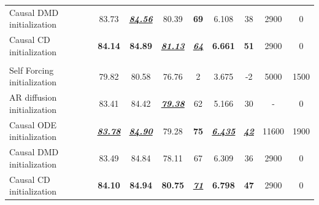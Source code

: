 \begin{table}
\begin{tabular}{lcccccccc}
      Causal DMD initialization  & 83.73 & \underline{\textbf{\textit{84.56}}}  &   80.39& \textbf{69} & 6.108 & 38 & \cellcolor{green!10}2900&\cellcolor{green!10}0 \\
      Causal CD initialization  &\textbf{84.14} & \textbf{84.89}  &   \underline{\textbf{\textit{81.13}}} & \underline{\textbf{\textit{64}}} &\textbf{6.661} & \textbf{51} & \cellcolor{green!10}2900& \cellcolor{green!10}0 \\
        \midrule
     \rowcolor{catgray}
    \multicolumn{9}{l}{\textit{4-Step Asymmetric DMD}}\\
     Self Forcing initialization  & 79.82 & 80.58  &  76.76& 2 & 3.675 & -2 &\cellcolor{red!10}5000 &\cellcolor{red!10}1500\\
      AR diffusion initialization  & 83.41 & 84.42  &   \underline{\textbf{\textit{79.38}}} & 62 & 5.166 &  30& \cellcolor{green!10}- &\cellcolor{green!10}0\\
      Causal ODE initialization  & \underline{\textbf{\textit{83.78}}} & \underline{\textbf{\textit{84.90}}}  &   79.28  &  \textbf{75}&\underline{\textbf{\textit{6.435}}} &  \underline{\textbf{\textit{42}}}& \cellcolor{red!10}11600 & \cellcolor{red!10}1900 \\
      Causal DMD initialization  &83.49 & 84.84  &   78.11& 67 & 6.309&  36 & \cellcolor{green!10}2900 & \cellcolor{green!10}0\\
      Causal CD initialization  & \textbf{84.10} & \textbf{84.94}  &   \textbf{80.75} & \underline{\textbf{\textit{71}}} &\textbf{6.798} &  \textbf{47}& \cellcolor{green!10}2900 & \cellcolor{green!10}0\\
    \bottomrule
  \end{tabular}
\end{table}